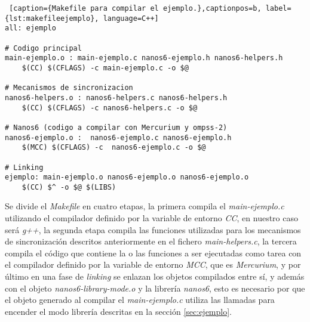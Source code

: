 \begin{lstlisting} [caption={Makefile para compilar el ejemplo.},captionpos=b, label={lst:makefileejemplo}, language=C++]                                                                                                                                               
all: ejemplo

# Codigo principal
main-ejemplo.o : main-ejemplo.c nanos6-ejemplo.h nanos6-helpers.h                                                                                                                                       
    $(CC) $(CFLAGS) -c main-ejemplo.c -o $@                                                                                                                                                                 

# Mecanismos de sincronizacion
nanos6-helpers.o : nanos6-helpers.c nanos6-helpers.h
    $(CC) $(CFLAGS) -c nanos6-helpers.c -o $@                                                                                                                                                                 

# Nanos6 (codigo a compilar con Mercurium y ompss-2)
nanos6-ejemplo.o :  nanos6-ejemplo.c nanos6-ejemplo.h
    $(MCC) $(CFLAGS) -c  nanos6-ejemplo.c -o $@                                                                                                                                                             

# Linking
ejemplo: main-ejemplo.o nanos6-ejemplo.o nanos6-ejemplo.o                                                                                                                                      
    $(CC) $^ -o $@ $(LIBS)                                                                                                                                                                                    
\end{lstlisting}

Se divide el \textit{Makefile} en cuatro etapas, la primera compila el \textit{main-ejemplo.c} utilizando el compilador definido por la variable de entorno \textit{CC}, en nuestro caso será \textit{g++}, la segunda etapa compila las funciones utilizadas para los mecanismos de sincronización descritos anteriormente en el fichero \textit{main-helpers.c}, la tercera compila el código que contiene la o las funciones a ser ejecutadas como tarea con el compilador definido por la variable de entorno \textit{MCC}, que es \textit{Mercurium}, y por último en una fase de \textit{linking} se enlazan los objetos compilados entre sí, y además con el objeto \textit{nanos6-library-mode.o} y la librería \textit{nanos6}, esto es necesario por que el objeto generado al compilar el \textit{main-ejemplo.c} utiliza las llamadas para encender el modo librería descritas en la sección \ref{sec:ejemplo}.


